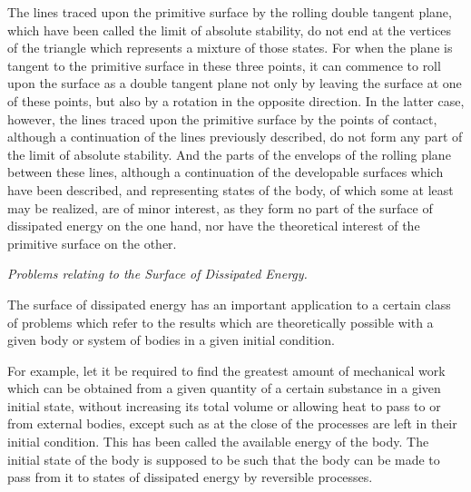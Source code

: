 \documentclass[11pt]{article}
\begin{document}
The lines traced upon the primitive surface by the rolling double tangent plane, which have been called the limit of absolute stability, do not end at the vertices of the triangle which represents a mixture of those states. For when the plane is tangent to the primitive surface in these three points, it can commence to roll upon the surface as a double tangent plane not only by leaving the surface at one of these points, but also by a rotation in the opposite direction. In the latter case, however, the lines traced upon the primitive surface by the points of contact, although a continuation of the lines previously described, do not form any part of the limit of absolute stability. And the parts of the envelops of the rolling plane between these lines, although a continuation of the developable surfaces which have been described, and representing states of the body, of which some at least may be realized, are of minor interest, as they form no part of the surface of dissipated energy on the one hand, nor have the theoretical interest of the primitive surface on the other.

\begin{center}
\itshape Problems relating to the Surface of Dissipated Energy.
\end{center}

The surface of dissipated energy has an important application to a certain class of problems which refer to the results which are theoretically possible with a given body or system of bodies in a given initial condition.

For example, let it be required to find the greatest amount of mechanical work which can be obtained from a given quantity of a certain substance in a given initial state, without increasing its total volume or allowing heat to pass to or from external bodies, except such as at the close of the processes are left in their initial condition. This has been called the available energy of the body. The initial state of the body is supposed to be such that the body can be made to pass from it to states of dissipated energy by reversible processes.
\end{document}
